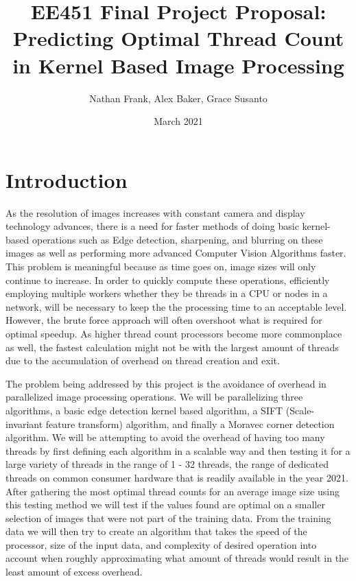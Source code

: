 \documentclass{article}
\title{EE451 Final Project Proposal: \\Predicting Optimal Thread Count in Kernel Based Image Processing}
\author{Nathan Frank, Alex Baker, Grace Susanto}
\date{March 2021}
\begin{document}
    \maketitle
    
    \section{Introduction}
        \begin{multicols}{2}
            As the resolution of images increases with constant camera and display technology advances, there is a need for faster methods of doing basic kernel-based operations such as Edge detection, sharpening, and blurring on these images as well as performing more advanced Computer Vision Algorithms faster.  This problem is meaningful because as time goes on, image sizes will only continue to increase.  In order to quickly compute these operations, efficiently employing multiple workers whether they be threads in a CPU or nodes in a network, will be necessary to keep the the processing time to an acceptable level.  However, the brute force approach will often overshoot what is required for optimal speedup.  As higher thread count processors become more commonplace as well, the fastest calculation might not be with the largest amount of threads due to the accumulation of overhead on thread creation and exit.
            
            The problem being addressed by this project is the avoidance of overhead in parallelized image processing operations.  We will be parallelizing three algorithms, a basic edge detection kernel based algorithm, a SIFT (Scale-invariant feature transform) algorithm, and finally a Moravec corner detection algorithm.  We will be attempting to avoid the overhead of having too many threads by first defining each algorithm in a scalable way and then testing it for a large variety of threads in the range of 1 - 32 threads, the range of dedicated threads on common consumer hardware that is readily available in the year 2021.  After gathering the most optimal thread counts for an average image size using this testing method we will test if the values found are optimal on a smaller selection of images that were not part of the training data.  From the training data we will then try to create an algorithm that takes the speed of the processor, size of the input data, and complexity of desired operation into account when roughly approximating what amount of threads would result in the least amount of excess overhead.
            
        \end{multicols}
        \pagebreak
    
\end{document}
